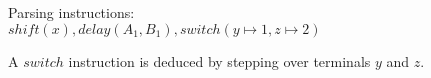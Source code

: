 \documentclass[a4paper,11pt]{article}
\begin{document}
\begin{figure}[!ht]
\begin{center}
\parbox{.3\textwidth}{}
\parbox{.65\textwidth}{Parsing instructions:\\$shift(x), delay(A_1, B_1), switch(y \mapsto 1, z \mapsto 2)$}
\caption{A $switch$ instruction is deduced by stepping over terminals $y$ and $z$.}
\end{center}
\end{figure}
\end{document}
